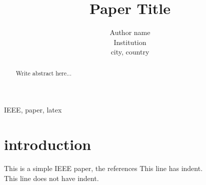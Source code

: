 \documentclass[conference]{IEEEtran}
\begin{document}
\title{Paper Title}
\author{Author name\\
Institution\\
city, country}
\maketitle

\begin{abstract}
Write abstract here...
\end{abstract}

\begin{IEEEkeywords}
IEEE, paper, latex
\end{IEEEkeywords}

\section{introduction}\label{s1}
This is a simple IEEE paper, the references \cite{r1}
\indent This line has indent.\\
\noindent This line does not have indent.



\end{document}

